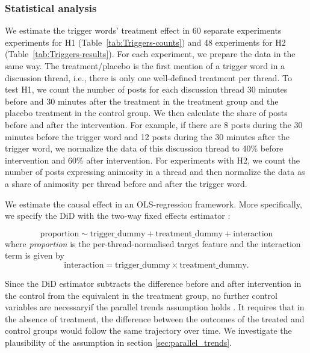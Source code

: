 \subsubsection{Statistical analysis}

We estimate the trigger words' treatment effect in 60 separate experiments experiments for H1 (Table~\ref{tab:Triggers-counts}) and 48 experiments for H2 (Table~\ref{tab:Triggers-results}). For each experiment, we prepare the data in the same way. The treatment/placebo is the first mention of a trigger word in a discussion thread, i.e., there is only one well-defined treatment per thread. 
To test H1, we count the number of posts for each discussion thread 30 minutes before and 30 minutes after the treatment in the treatment group and the placebo treatment in the control group. We then calculate the share of posts before and after the intervention. For example, if there are 8 posts during the 30 minutes before the trigger word and 12 posts during the 30 minutes after the trigger word, we normalize the data of this discussion thread to 40\% before intervention and 60\% after intervention. For experiments with H2, we count the number of posts expressing animosity in a thread and then normalize the data as a share of animosity per thread before and after the trigger word.

We estimate the causal effect in an OLS-regression framework. More specifically, we specify the DiD with the two-way fixed effects estimator \cite{angrist2009mostly}:

\[
\text{proportion} \sim \text{trigger\_dummy} + \text{treatment\_dummy} + \text{interaction}
\] where \textit{proportion} is the per-thread-normalised target feature and the interaction term is given by
\[
\text{interaction} = \text{trigger\_dummy} \times \text{treatment\_dummy}.
\]

Since the DiD estimator subtracts the difference before and after intervention in the control from the equivalent in the treatment group, no further control variables are necessary\textemdash if the parallel trends assumption holds \cite{roth2023s}. It requires that in the absence of treatment, the difference between the outcomes of the treated and control groups would follow the same trajectory over time. We investigate the plausibility of the assumption in section \ref{sec:parallel_trends}.




